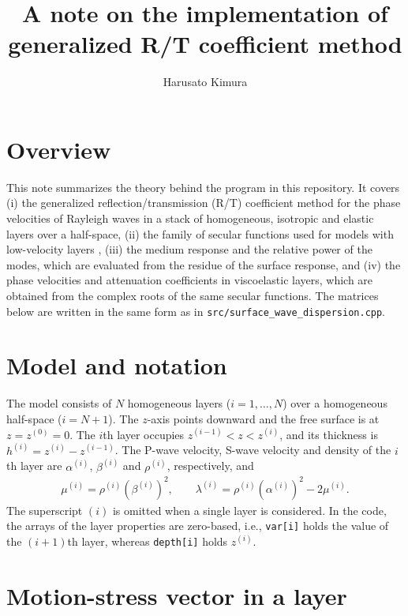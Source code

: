 \documentclass[a4paper, 10pt]{article}
\title{\vspace{-2.0cm}A note on the implementation of generalized R/T coefficient method}
\author{Harusato Kimura}
\begin{document}
\maketitle

\section{Overview}

This note summarizes the theory behind the program in this repository.
It covers
(i) the generalized reflection/transmission (R/T) coefficient method \parencite{chen1993} for the phase velocities of Rayleigh waves in a stack of homogeneous, isotropic and elastic layers over a half-space,
(ii) the family of secular functions used for models with low-velocity layers \parencite{he2006,wu2016,yuan2024},
(iii) the medium response and the relative power of the modes, which are evaluated from the residue of the surface response, and
(iv) the phase velocities and attenuation coefficients in viscoelastic layers, which are obtained from the complex roots of the same secular functions.
The matrices below are written in the same form as in \texttt{src/surface\_wave\_dispersion.cpp}.

\section{Model and notation}

The model consists of $N$ homogeneous layers ($i = 1, \dots, N$) over a homogeneous half-space ($i = N + 1$).
The $z$-axis points downward and the free surface is at $z = z^{(0)} = 0$.
The $i$th layer occupies $z^{(i - 1)} < z < z^{(i)}$, and its thickness is $h^{(i)} = z^{(i)} - z^{(i - 1)}$.
The P-wave velocity, S-wave velocity and density of the $i$th layer are $\alpha^{(i)}$, $\beta^{(i)}$ and $\rho^{(i)}$, respectively, and
\begin{align}
  \mu^{(i)} = \rho^{(i)} \left( \beta^{(i)} \right)^2, \qquad
  \lambda^{(i)} = \rho^{(i)} \left( \alpha^{(i)} \right)^2 - 2 \mu^{(i)}.
\end{align}
The superscript $(i)$ is omitted when a single layer is considered.
In the code, the arrays of the layer properties are zero-based, i.e., \texttt{var[i]} holds the value of the $(i + 1)$th layer, whereas \texttt{depth[i]} holds $z^{(i)}$.

\section{Motion-stress vector in a layer}
\end{document}
